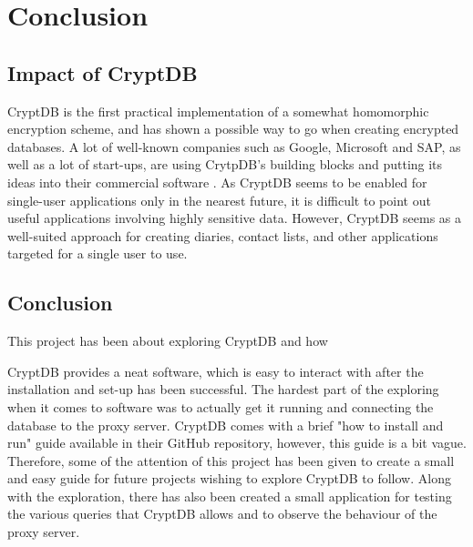 \chapter{Conclusion}
\label{chp:conclusion}

\section{Impact of CryptDB}

CryptDB is the first practical implementation of a somewhat homomorphic encryption scheme, and has shown a possible way to go when creating encrypted databases. A lot of well-known companies such as Google, Microsoft and SAP, as well as a lot of start-ups, are using CrytpDB's building blocks and putting its ideas into their commercial software \cite{cryptdb_homepage}. As CryptDB seems to be enabled for single-user applications only in the nearest future, it is difficult to point out useful applications involving highly sensitive data. However, CryptDB seems as a well-suited approach for creating diaries, contact lists, and other applications targeted for a single user to use.

\section{Conclusion}

This project has been about exploring CryptDB and how 

CryptDB provides a neat software, which is easy to interact with after the installation and set-up has been successful. The hardest part of the exploring when it comes to software was to actually get it running and connecting the database to the proxy server. CryptDB comes with a brief "how to install and run" guide available in their GitHub repository, however, this guide is a bit vague. Therefore, some of the attention of this project has been given to create a small and easy guide for future projects wishing to explore CryptDB to follow. Along with the exploration, there has also been created a small application for testing the various queries that CryptDB allows and to observe the behaviour of the proxy server.


